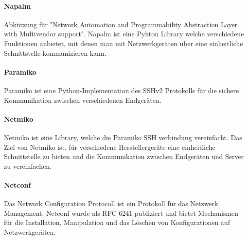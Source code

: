 \documentclass[]{subfiles}
\begin{document}
\paragraph{Napalm}
Abkürzung für "Network Automation and Programmability Abstraction Layer with Multivendor support".
Napalm ist eine Pyhton Library welche verschiedene Funktionen anbietet, mit denen man 
mit Netzwerkgeräten über eine einheitliche Schnittstelle kommunizieren kann.

\paragraph{Paramiko}
Paramiko ist eine Python-Implementation des SSHv2 Protokolls für die sichere Kommunikation
zwischen verschiedenen Endgeräten.

\paragraph{Netmiko}
Netmiko ist eine Library, welche die Paramiko SSH verbindung vereinfacht. 
Das Ziel von Netmiko ist, für verschiedene Herstellergeräte eine einheitliche Schnittstelle
zu bieten und die Kommunikation zwischen Endgeräten und Server zu vereinfachen.

\paragraph{Netconf}
Das Network Configuration Protocoll ist ein Protokoll für das Netzwerk Management.
Netconf wurde als RFC 6241 publiziert und bietet Mechanismen für die Installation,
Manipulation und das Löschen von Konfigurationen auf Netzwerkgeräten.
\end{document}
